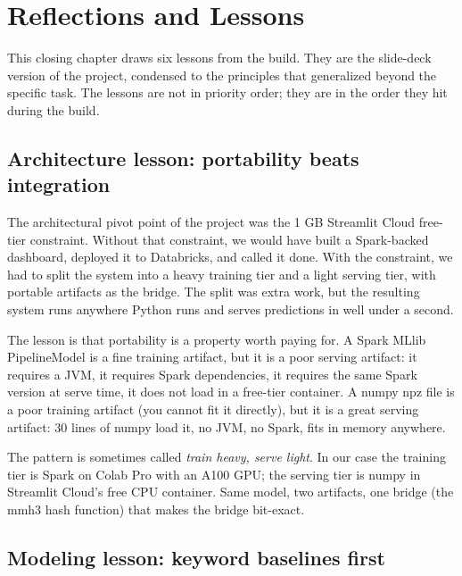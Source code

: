 \documentclass[11pt,letterpaper]{book}
\begin{document}

\chapter{Reflections and Lessons}
\label{ch:reflections}

This closing chapter draws six lessons from the build. They are the slide-deck version of the project, condensed to the principles that generalized beyond the specific task. The lessons are not in priority order; they are in the order they hit during the build.

\section{Architecture lesson: portability beats integration}

The architectural pivot point of the project was the 1 GB Streamlit Cloud free-tier constraint. Without that constraint, we would have built a Spark-backed dashboard, deployed it to Databricks, and called it done. With the constraint, we had to split the system into a heavy training tier and a light serving tier, with portable artifacts as the bridge. The split was extra work, but the resulting system runs anywhere Python runs and serves predictions in well under a second.

The lesson is that portability is a property worth paying for. A Spark MLlib PipelineModel is a fine training artifact, but it is a poor serving artifact: it requires a JVM, it requires Spark dependencies, it requires the same Spark version at serve time, it does not load in a free-tier container. A numpy npz file is a poor training artifact (you cannot fit it directly), but it is a great serving artifact: 30 lines of numpy load it, no JVM, no Spark, fits in memory anywhere.

The pattern is sometimes called \emph{train heavy, serve light}. In our case the training tier is Spark on Colab Pro with an A100 GPU; the serving tier is numpy in Streamlit Cloud's free CPU container. Same model, two artifacts, one bridge (the mmh3 hash function) that makes the bridge bit-exact.

\section{Modeling lesson: keyword baselines first}
\end{document}
